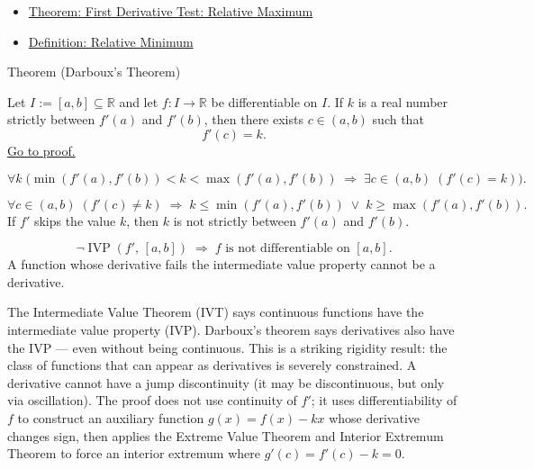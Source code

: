 \begin{dependencies}
\begin{itemize}
  \item \hyperref[thm:first-derivative-test-maximum]{Theorem: First Derivative Test: Relative Maximum}
  \item \hyperref[def:relative-minimum]{Definition: Relative Minimum}
\end{itemize}
\end{dependencies}


\begin{theorembox}{Theorem (Darboux's Theorem)}
\begin{theorem}
\label{thm:darboux}
Let $I := [a,b] \subseteq \mathbb{R}$ and let $f : I \to \mathbb{R}$ be differentiable on $I$. If $k$ is a real number strictly between $f'(a)$ and $f'(b)$, then there exists $c \in (a,b)$ such that
\[
f'(c) = k.
\]
\hyperref[prf:darboux]{Go to proof.}
\end{theorem}
\end{theorembox}

\begin{remark*}
\[
\forall k\;\bigl(\min(f'(a),f'(b)) < k < \max(f'(a),f'(b))
\;\Rightarrow\; \exists c \in (a,b)\;(f'(c)=k)\bigr).
\]
\end{remark*}

\begin{remark*}
\[
\forall c \in (a,b)\;(f'(c) \neq k)
\;\Rightarrow\;
k \leq \min(f'(a),f'(b)) \;\lor\; k \geq \max(f'(a),f'(b)).
\]
If $f'$ skips the value $k$, then $k$ is not strictly between $f'(a)$ and $f'(b)$.
\end{remark*}

\begin{remark*}
\[
\lnot\operatorname{IVP}(f',\,[a,b]) \;\Rightarrow\; f \text{ is not differentiable on } [a,b].
\]
A function whose derivative fails the intermediate value property cannot be a derivative.
\end{remark*}

\begin{remark*}[Interpretation]
The Intermediate Value Theorem (IVT) says continuous functions have the intermediate value property (IVP). Darboux's theorem says derivatives also have the IVP --- even without being continuous. This is a striking rigidity result: the class of functions that can appear as derivatives is severely constrained. A derivative cannot have a jump discontinuity (it may be discontinuous, but only via oscillation). The proof does not use continuity of $f'$; it uses differentiability of $f$ to construct an auxiliary function $g(x) = f(x) - kx$ whose derivative changes sign, then applies the Extreme Value Theorem and Interior Extremum Theorem to force an interior extremum where $g'(c) = f'(c) - k = 0$.
\end{remark*}


